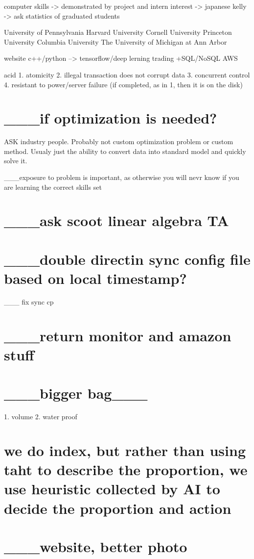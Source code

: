 {{{{{{{{{{computer skills -> demonstrated by project and intern
interest -> japanese
kelly -> ask statistics of graduated students

University of Pennsylvania
Harvard University
Cornell University
Princeton University
Columbia University
The University of Michigan at Ann Arbor

website
c++/python --> tensorflow/deep lerning trading
+SQL/NoSQL 
AWS

acid
1. atomicity
2. illegal transaction does not corrupt data
3. concurrent control
4. resistant to power/server failure (if completed, as in 1, then it is on the disk)

\section*{___if optimization is needed?}
ASK industry people.
Probably not custom optimization problem or custom method. Usualy just the ability to convert data into standard model and quickly solve it.

___exposure to problem is important, as otherwise you will nevr know if you are learning the correct skills set

\section*{___ask scoot linear algebra TA}
\section*{___double directin sync config file based on local timestamp?}
	___ fix sync cp 
\section*{___return monitor and amazon stuff}
\section*{___bigger  bag___}
	1. volume
	2. water proof


\section*{we do index, but rather than using taht to describe the proportion, we use heuristic collected by AI to decide the proportion and action}

\section*{___website, better photo}

}}}}}}}}}}
